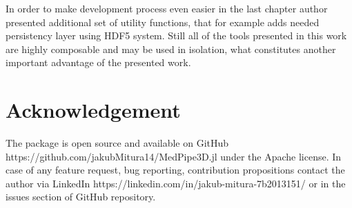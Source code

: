 \documentclass{juliacon}
\begin{document}
In order to make development process even easier in the last chapter author presented additional set of utility functions, that for example adds needed persistency layer  using HDF5 system. Still all of the tools presented in this work are highly composable and may be used in isolation, what constitutes another important advantage of the presented work. 

\section*{Acknowledgement}
The package is open source and available on GitHub https://github.com/jakubMitura14/MedPipe3D.jl under the Apache license. In case of any feature request, bug reporting, contribution propositions contact the author via LinkedIn https://linkedin.com/in/jakub-mitura-7b2013151/ or in the issues section of GitHub repository.




\end{document}
